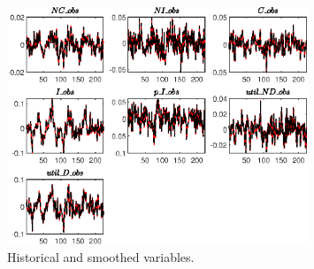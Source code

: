  
\begin{figure}[H]
\centering 
\includegraphics[width=0.80\textwidth]{BRS_sectoral_artificial_data/graphs/BRS_sectoral_artificial_data_HistoricalAndSmoothedVariables1}
\caption{Historical and smoothed variables.}\label{Fig:HistoricalAndSmoothedVariables:1}
\end{figure}


